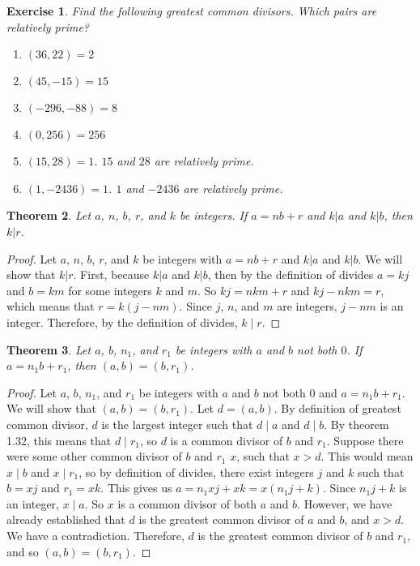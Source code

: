 \documentclass[12pt,leqno]{article}
\numberwithin{equation}{section}
\newtheorem{thm}{Theorem}[section]
\newtheorem{exer}[thm]{Exercise}
\theoremstyle{definition}
\begin{document}
\begin{exer}
Find the following greatest common divisors. Which pairs are
relatively prime?
\begin{enumerate}
    \item[(1)] $(36,22) = 2$
    \item[(2)] $(45,-15) = 15$
    \item[(3)] $(-296,-88) = 8$
    \item[(4)] $(0,256) = 256$
    \item[(5)] $(15,28) = 1$.  $15$ and $28$ are relatively prime.
    \item[(6)] $(1,-2436) = 1$. $1$ and $-2436$ are relatively prime.
\end{enumerate}
\end{exer}

\begin{thm}
Let $a$, $n$, $b$, $r$, and $k$ be integers. If $a = nb + r$ and
$k|a$ and $k|b$, then $k|r$.
\end{thm}

\begin{proof}[Proof]
Let $a$, $n$, $b$, $r$, and $k$ be integers with $a = nb + r$ and $k|a$ and $k|b$. We will show that $k|r$.  First, because $k|a$ and $k|b$, then by the definition of divides $a = kj$ and $b = km$ for some integers $k$ and $m$.  So $kj = nkm + r$ and $kj - nkm = r$, which means that $r = k(j - nm)$.  Since $j$, $n$, and $m$ are integers, $j - nm$ is an integer.  Therefore, by the definition of divides, $k \mid r$.
\end{proof}

\pagebreak
\begin{thm}
Let $a$, $b$, $n_1$, and $r_1$ be integers with $a$ and $b$ not both
$0$. If $a = n_1b + r_1$, then $(a, b) = (b, r_1)$.
\end{thm}

\begin{proof}[Proof]
Let $a$, $b$, $n_1$, and $r_1$ be integers with $a$ and $b$ not both $0$ and $a = n_1b + r_1$.  We will show that $(a, b) = (b, r_1)$.  Let $d = (a, b)$.  By definition of greatest common divisor, $d$ is the largest integer such that $d \mid a$ and $d \mid b$.  By theorem 1.32, this means that $d \mid r_1$, so $d$ is a common divisor of $b$ and $r_1$. Suppose there were some other common divisor of $b$ and $r_1$ $x$, such that $x > d$.  This would mean $x \mid b$ and $x \mid r_1$, so by definition of divides, there exist integers $j$ and $k$ such that $b = xj$ and $r_1 = xk$.  This gives us $a = n_1xj + xk = x(n_1j + k)$.  Since $n_1j + k$ is an integer, $x \mid a$.  So $x$ is a common divisor of both $a$ and $b$.  However, we have already established that $d$ is the greatest common divisor of $a$ and $b$, and $x > d$.  We have a contradiction.  Therefore, $d$ is the greatest common divisor of $b$ and $r_1$, and so $(a, b) = (b, r_1)$.
\end{proof}
\end{document}
